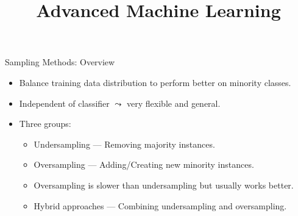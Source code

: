 \documentclass[11pt,compress,t,notes=noshow, xcolor=table]{beamer}
\title{Advanced Machine Learning}
\date{}
\begin{document}
	

\sloppy
	
\begin{frame}{Sampling Methods: Overview}
    \begin{itemize}

        \item Balance training data distribution to perform better on minority classes.
        
        \item Independent of classifier $\leadsto$ very flexible and general.

        \item Three groups: 
    
        \begin{minipage}{0.5\textwidth}
    
            \begin{itemize} 
                
                \item Undersampling --- Removing majority instances.
        
                \item Oversampling --- Adding/Creating new minority instances.

                \item Oversampling is slower than undersampling but usually works better.

                \item Hybrid approaches --- Combining undersampling and oversampling.
        
            \end{itemize}
    
        \end{minipage}
        \begin{minipage}{0.4\textwidth}
                \begin{figure}
                \centering
            \end{figure}
        \end{minipage}

    \end{itemize}
    
\end{frame}
\end{document}

